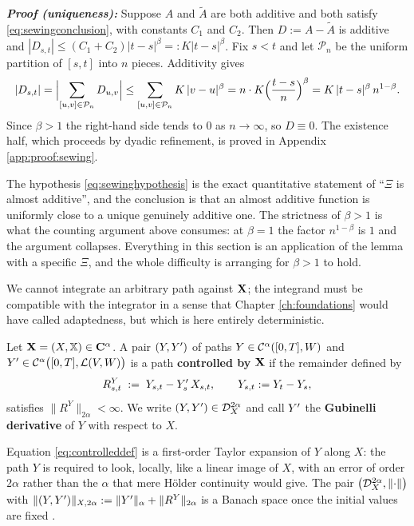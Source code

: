\textbf{\textit{Proof (uniqueness):}} Suppose $A$ and $\widetilde A$ are both additive and both
satisfy \eqref{eq:sewingconclusion}, with constants $C_1$ and $C_2$. Then $D := A - \widetilde A$ is
additive and $|D_{s,t}| \leq (C_1+C_2)|t-s|^\beta =: K|t-s|^\beta$. Fix $s<t$ and let
$\mathcal{P}_n$ be the uniform partition of $[s,t]$ into $n$ pieces. Additivity gives
\[
|D_{s,t}| = \Bigl|\sum_{[u,v]\in\mathcal{P}_n} D_{u,v}\Bigr| \leq \sum_{[u,v]\in\mathcal{P}_n} K\,|v-u|^\beta
= n \cdot K \Bigl(\frac{t-s}{n}\Bigr)^{\beta} = K\,|t-s|^{\beta}\,n^{1-\beta}.
\]
Since $\beta>1$ the right-hand side tends to $0$ as $n\to\infty$, so $D \equiv 0$. The existence
half, which proceeds by dyadic refinement, is proved in Appendix \ref{app:proof:sewing}.
\qedfilledtext

\medskip

The hypothesis \eqref{eq:sewinghypothesis} is the exact quantitative statement of ``$\Xi$ is almost
additive'', and the conclusion is that an almost additive function is uniformly close to a unique
genuinely additive one. The strictness of $\beta>1$ is what the counting argument above consumes: at $\beta=1$ the factor $n^{1-\beta}$ is $1$ and the argument collapses.
Everything in this section is an application of the lemma with a specific $\Xi$, and the whole
difficulty is arranging for $\beta>1$ to hold.

\medskip

We cannot integrate an arbitrary path against
$\mathbf{X}$; the integrand must be compatible with the integrator in a sense that Chapter \ref{ch:foundations}
would have called adaptedness, but which is here entirely deterministic.

\begin{definition}\label{def:controlled}
Let $\mathbf{X} = (X,\mathbb{X})\in\mathbf{C}^{\alpha}$. A pair $(Y,Y')$ of paths
$Y \in \mathcal{C}^{\alpha}([0,T],W)$ and
$Y' \in \mathcal{C}^{\alpha}\bigl([0,T],\mathcal{L}\!\left(V,W\right)\bigr)$ is a path \textbf{controlled by} $\mathbf{X}$ if
the remainder defined by
\begin{equation}\label{eq:controlleddef}
R^{Y}_{s,t} \;:=\; Y_{s,t} - Y'_s\,X_{s,t}, \qquad Y_{s,t} := Y_t - Y_s,
\end{equation}
satisfies $\lVert R^Y\rVert_{2\alpha} < \infty$. We write $(Y,Y') \in \mathcal{D}^{2\alpha}_{X}$ and call $Y'$
the \textbf{Gubinelli derivative} of $Y$ with respect to $X$.
\end{definition}

Equation \eqref{eq:controlleddef} is a first-order Taylor expansion of $Y$ along $X$: the path $Y$
is required to look, locally, like a linear image of $X$, with an error of order $2\alpha$ rather
than the $\alpha$ that mere Hölder continuity would give. The pair $\bigl(\mathcal{D}^{2\alpha}_{X}, \lVert\cdot\rVert\bigr)$
with $\lVert (Y,Y')\rVert_{X,2\alpha} := \lVert Y'\rVert_\alpha + \lVert R^Y\rVert_{2\alpha}$ is
a Banach space once the initial values are fixed \cite[Ch.\ 4]{frizhairer2020}.

